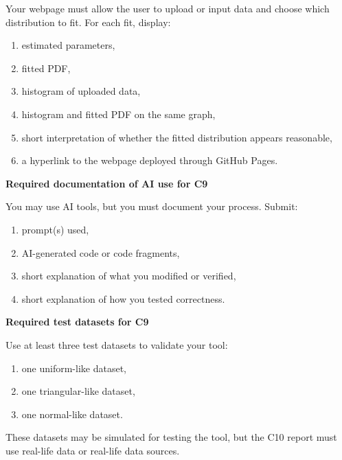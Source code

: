 \documentclass[12pt]{article}
\newcommand{\SubsectionBox}[1]{%
	\noindent\colorbox{gray!30}{%
		\parbox{\linewidth}{\textbf{#1}}%
	}\par\vspace{0.35cm}%
}
\begin{document}
	Your webpage must allow the user to upload or input data and choose which distribution to fit. For each fit, display:
	\begin{enumerate}
		\item estimated parameters,
		\item fitted PDF,
		\item histogram of uploaded data,
		\item histogram and fitted PDF on the same graph,
		\item short interpretation of whether the fitted distribution appears reasonable,
		\item a hyperlink to the webpage deployed through GitHub Pages.
	\end{enumerate}
	
	\SubsectionBox{Required documentation of AI use for C9}
	You may use AI tools, but you must document your process. Submit:
	\begin{enumerate}
		\item prompt(s) used,
		\item AI-generated code or code fragments,
		\item short explanation of what you modified or verified,
		\item short explanation of how you tested correctness.
	\end{enumerate}
	
	\SubsectionBox{Required test datasets for C9}
	Use at least three test datasets to validate your tool:
	\begin{enumerate}
		\item one uniform-like dataset,
		\item one triangular-like dataset,
		\item one normal-like dataset.
	\end{enumerate}
	
	These datasets may be simulated for testing the tool, but the C10 report must use real-life data or real-life data sources.
	
\end{document}

